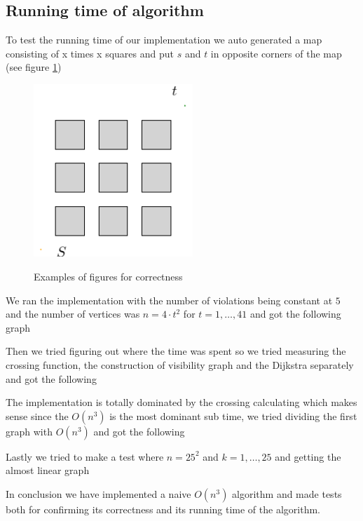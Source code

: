\subsection{Running time of algorithm}
To test the running time of our implementation we auto generated a map consisting of
x times x squares and put $s$ and $t$ in opposite corners of the map (see figure
\ref{fig:test})

\begin{figure}[H]
    \centering
	\includegraphics[width=6cm]{figures/testexample.pdf}
	\label{fig:test}
	\caption{Examples of figures for correctness}
\end{figure}
\label{testfilegeneration}
We ran the implementation with the number of violations being constant at $5$ and the
number of vertices was $n= 4 \cdot t^2$ for $t=1,\dots,41$ and got the following graph

\begin{center}

\end{center}

Then we tried figuring out where the time was spent so we tried measuring the
crossing function, the construction of visibility graph and the Dijkstra
separately and got the following

\begin{center}

\end{center}

The implementation is totally dominated by the crossing calculating which makes
sense since the $O(n^3)$ is the most dominant sub time, we tried dividing the first graph
with $O(n^3)$ and got the following

\begin{center}

\end{center}

Lastly we tried to make a test where $n=25^2$ and $k=1,\dots,25$ and getting
the almost linear graph

\begin{center}

\end{center}

In conclusion we have implemented a naive $O(n^3)$ algorithm and made tests both
for confirming its correctness and its running time of the algorithm.
